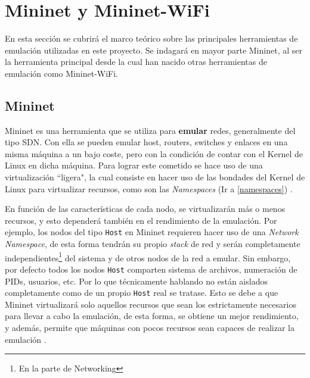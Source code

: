 \section{Mininet y Mininet-WiFi}
\label{sec:mininet}

En esta sección se cubrirá el marco teórico sobre las principales herramientas de emulación utilizadas en este proyecto. Se indagará en mayor parte Mininet, al ser la herramienta principal desde la cual han nacido otras herramientas de emulación como Mininet-WiFi.\\

\subsection{Mininet}

Mininet es una herramienta que se  utiliza para \textbf{emular} redes,  generalmente del tipo SDN. Con ella se pueden emular host, routers, switches y enlaces en una misma máquina a un bajo coste, pero con la condición de contar con el Kernel de Linux en dicha máquina. Para lograr este cometido se hace uso de una virtualización ``ligera", la cual consiste en hacer uso de las bondades del Kernel de Linux para virtualizar recursos, como son las \textit{Namespaces} (Ir a \ref{namespaces}) \cite{lantz2010network}.\\
\par
En función de las características de cada nodo, se virtualizarán más o menos recursos, y esto dependerá también en el rendimiento de la emulación. Por ejemplo, los nodos del tipo \texttt{Host} en Mininet requieren hacer uso de una \textit{Network Namespace}, de esta forma tendrán su propio \textit{stack} de red y serán completamente independientes\footnote{En la parte de Networking} del sistema y de otros nodos de la red a emular. Sin embargo, por defecto todos los nodos \texttt{Host} comparten sistema de archivos, numeración de PIDs, usuarios, etc. Por lo que técnicamente hablando no están aislados completamente como de un propio \texttt{Host} real se tratase. Esto se debe a que Mininet virtualizará solo aquellos recursos que sean los estrictamente necesarios para llevar a cabo la emulación, de esta forma, se obtiene un mejor rendimiento, y además, permite que máquinas con pocos recursos sean capaces de realizar la emulación \cite{lantz2010network}.\\
\par
